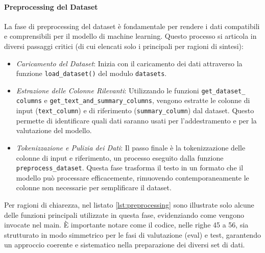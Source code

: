 \documentclass[12pt,a4paper,twoside,openright]{book}
\begin{document}
\paragraph{Preprocessing del Dataset}
La fase di preprocessing del dataset è fondamentale per rendere i dati compatibili e comprensibili per il modello di machine learning. Questo processo si articola in diversi passaggi critici (di cui elencati solo i principali per ragioni di sintesi):
\begin{itemize}
    \item \emph{Caricamento del Dataset}: Inizia con il caricamento dei dati attraverso la funzione \texttt{load\_dataset()} del modulo \texttt{datasets}. 
    \item \emph{Estrazione delle Colonne Rilevanti}: Utilizzando le funzioni \texttt{get\_dataset\_}\\ \texttt{columns} e \texttt{get\_text\_and\_summary\_columns}, vengono estratte le colonne di input (\texttt{text\_column}) e di riferimento (\texttt{summary\_column}) dal dataset. Questo permette di identificare quali dati saranno usati per l'addestramento e per la valutazione del modello.
    \item \emph{Tokenizzazione e Pulizia dei Dati}: Il passo finale è la tokenizzazione delle colonne di input e riferimento, un processo eseguito dalla funzione \texttt{preprocess\_dataset}. Questa fase trasforma il testo in un formato che il modello può processare efficacemente, rimuovendo contemporaneamente le colonne non necessarie per semplificare il dataset.
\end{itemize}
Per ragioni di chiarezza, nel listato \ref{lst:preprocessing} sono illustrate solo alcune delle funzioni principali utilizzate in questa fase, evidenziando come vengono invocate nel main. È importante notare come il codice, nelle righe 45 a 56, sia strutturato in modo simmetrico per le fasi di valutazione (eval) e test, garantendo un approccio coerente e sistematico nella preparazione dei diversi set di dati. 
\end{document}
